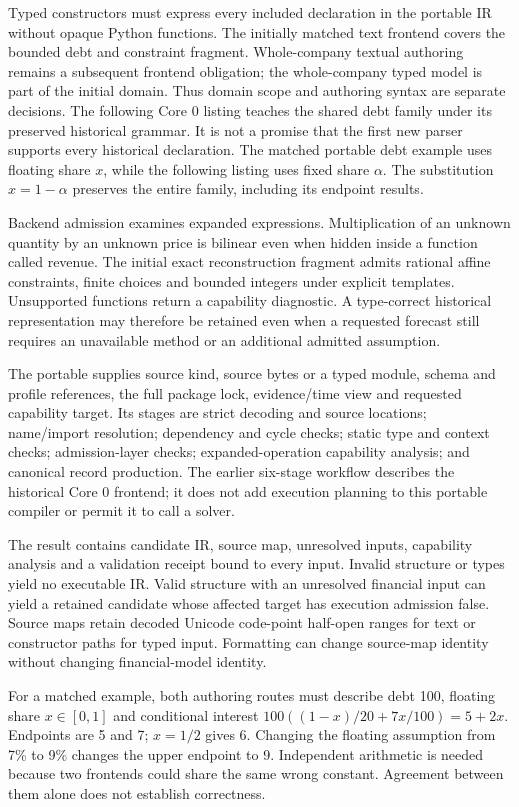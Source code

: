 Typed constructors must express every included declaration in the portable IR
without opaque Python functions. The initially matched text frontend covers the
bounded debt and constraint fragment. Whole-company textual authoring remains
a subsequent frontend obligation; the whole-company typed model is part of the
initial domain. Thus domain scope and authoring syntax are separate decisions.
The following Core 0 listing teaches the shared debt family under its preserved
historical grammar. It is not a promise that the first new parser supports every
historical declaration.
The matched portable debt example uses floating share $x$, while the following
listing uses fixed share $\alpha$. The substitution $x=1-\alpha$ preserves
the entire family, including its endpoint results.

Backend admission examines expanded expressions. Multiplication of an unknown
quantity by an unknown price is bilinear even when hidden inside a function
called revenue. The initial exact reconstruction fragment admits rational affine
constraints, finite choices and bounded integers under explicit templates.
Unsupported functions return a capability diagnostic. A type-correct historical
representation may therefore be retained even when a requested forecast still
requires an unavailable method or an additional admitted assumption.

The portable  supplies source kind, source bytes or a typed
module, schema and profile references, the full package lock, evidence/time view
and requested capability target. Its stages are strict decoding and source
locations; name/import resolution; dependency and cycle checks; static type and
context checks; admission-layer checks; expanded-operation capability analysis;
and canonical record production. The earlier six-stage workflow describes the
historical Core 0 frontend; it does not add execution planning to this portable
compiler or permit it to call a solver.

The result contains candidate IR, source map, unresolved inputs, capability
analysis and a validation receipt bound to every input. Invalid structure or
types yield no executable IR. Valid structure with an unresolved financial input
can yield a retained candidate whose affected target has execution admission
false. Source maps retain decoded Unicode code-point half-open ranges for text
or constructor paths for typed input. Formatting can change source-map identity
without changing financial-model identity.

For a matched example, both authoring routes must describe debt 100, floating
share $x\in[0,1]$ and conditional interest
$100((1-x)/20+7x/100)=5+2x$. Endpoints are 5 and 7; $x=1/2$ gives 6. Changing
the floating assumption from 7\% to 9\% changes the upper endpoint to 9.
Independent arithmetic is needed because two frontends could share the same
wrong constant. Agreement between them alone does not establish correctness.
